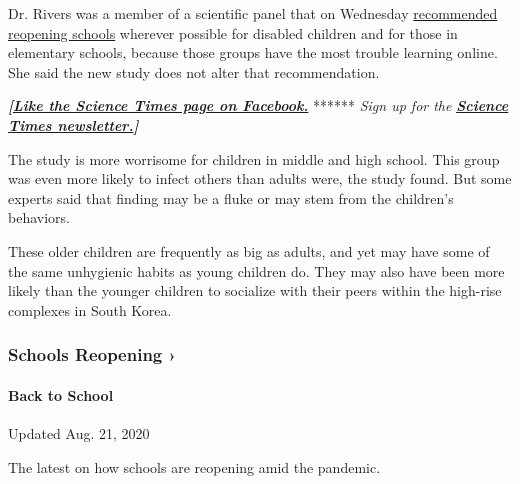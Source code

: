 Dr. Rivers was a member of a scientific panel that on Wednesday
\href{https://www.nytimes3xbfgragh.onion/2020/07/15/health/coronavirus-schools-reopening.html}{recommended
reopening schools} wherever possible for disabled children and for those
in elementary schools, because those groups have the most trouble
learning online. She said the new study does not alter that
recommendation.

\textbf{\emph{{[}}\href{http://on.fb.me/1paTQ1h}{\emph{Like the Science
Times page on Facebook.}}} ****** \emph{\textbar{} Sign up for the}
\textbf{\href{http://nyti.ms/1MbHaRU}{\emph{Science Times
newsletter.}}\emph{{]}}}

The study is more worrisome for children in middle and high school. This
group was even more likely to infect others than adults were, the study
found. But some experts said that finding may be a fluke or may stem
from the children's behaviors.

These older children are frequently as big as adults, and yet may have
some of the same unhygienic habits as young children do. They may also
have been more likely than the younger children to socialize with their
peers within the high-rise complexes in South Korea.

\href{https://www.nytimes3xbfgragh.onion/spotlight/schools-reopening?action=click\&pgtype=Article\&state=default\&region=MAIN_CONTENT_3\&context=storylines_keepup}{}

\hypertarget{schools-reopening-}{%
\subsubsection{Schools Reopening ›}\label{schools-reopening-}}

\hypertarget{back-to-school}{%
\paragraph{Back to School}\label{back-to-school}}

Updated Aug. 21, 2020

The latest on how schools are reopening amid the pandemic.

